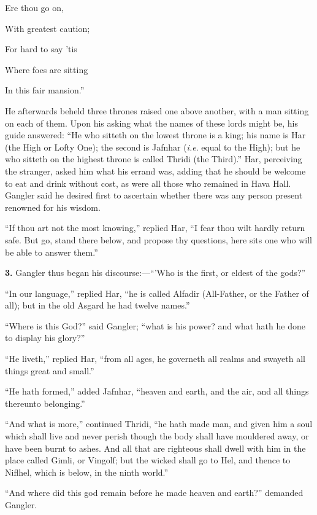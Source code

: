 Ere thou go on,

With greatest caution;

For hard to say 'tis

Where foes are sitting

In this fair mansion.''

He afterwards beheld three thrones raised one above another, with a
man sitting on each of them. Upon his asking what the names of these
lords might be, his guide answered: ``He who sitteth on the lowest
throne is a king; his name is Har (the High or Lofty One); the second
is Jafnhar (\emph{i.e}. equal to the High); but he who sitteth on the
highest throne is called Thridi (the Third).'' Har, perceiving the
stranger, asked him what his errand was, adding that he should be
welcome to eat and drink without cost, as were all those who remained
in Hava Hall. Gangler said he desired first to ascertain whether there
was any person present renowned for his wisdom.

``If thou art not the most knowing,'' replied Har, ``I fear thou wilt
hardly return safe. But go, stand there below, and propose thy
questions, here sits one who will be able to answer them.''


\textbf{3.} Gangler thus began his discourse:—``'Who is the first, or eldest
of the gods?''

``In our language,'' replied Har, ``he is called Alfadir (All-Father, or
the Father of all); but in the old Asgard he had twelve names.''

``Where is this God?'' said Gangler; ``what is his power? and what hath
he done to display his glory?''

``He liveth,'' replied Har, ``from all ages, he governeth all realms and
swayeth all things great and small.''

``He hath formed,'' added Jafnhar, ``heaven and earth, and the air, and
all things thereunto belonging.''

``And what is more,'' continued Thridi, ``he hath made man, and given him
a soul which shall live and never perish though the body shall have
mouldered away, or have been burnt to ashes. And all that are
righteous shall dwell with him in the place called Gimli, or Vingolf;
but the wicked shall go to Hel, and thence to Niflhel, which is below,
in the ninth world.''

``And where did this god remain before he made heaven and earth?''
demanded Gangler.


